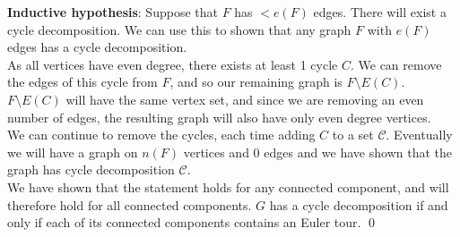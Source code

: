 \linebreak 
\textbf{Inductive hypothesis}: Suppose that $F$ has $< e(F)$ edges. There will exist a cycle decomposition. We can use this to shown that any graph $F$ with $e(F)$ edges has a cycle decomposition. \\
\linebreak 
As all vertices have even degree, there exists at least 1 cycle $C$. We can remove the edges of this cycle from $F$, and so our remaining graph is $F \setminus E(C)$. $F \setminus E(C)$ will have the same vertex set, and since we are removing an even number of edges, the resulting graph will also have only even degree vertices. \\
\linebreak 
We can continue to remove the cycles, each time adding $C$ to a set $\mathcal{C}$. Eventually we will have a graph on $n(F)$ vertices and 0 edges and we have shown that the graph has cycle decomposition $\mathcal{C}$.
\\
\linebreak 
We have shown that the statement holds for any connected component, and will therefore hold for all connected components. $G$ has a cycle decomposition if and only if each of its connected components contains an Euler tour. \qed